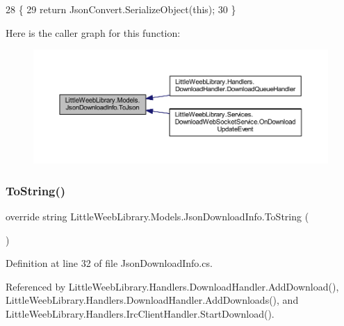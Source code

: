\begin{DoxyCode}
28         \{
29             \textcolor{keywordflow}{return} JsonConvert.SerializeObject(\textcolor{keyword}{this});
30         \}
\end{DoxyCode}
Here is the caller graph for this function\+:\nopagebreak
\begin{figure}[H]
\begin{center}
\leavevmode
\includegraphics[width=350pt]{class_little_weeb_library_1_1_models_1_1_json_download_info_a3fd450e7e2de8b9a936ba3b2cbeeaccb_icgraph}
\end{center}
\end{figure}
\mbox{\label{class_little_weeb_library_1_1_models_1_1_json_download_info_af36cbb3251b0efcd80a45f1fef89f5c9}} 
\subsubsection{\texorpdfstring{To\+String()}{ToString()}}
{\footnotesize\ttfamily override string Little\+Weeb\+Library.\+Models.\+Json\+Download\+Info.\+To\+String (\begin{DoxyParamCaption}{ }\end{DoxyParamCaption})}



Definition at line 32 of file Json\+Download\+Info.\+cs.



Referenced by Little\+Weeb\+Library.\+Handlers.\+Download\+Handler.\+Add\+Download(), Little\+Weeb\+Library.\+Handlers.\+Download\+Handler.\+Add\+Downloads(), and Little\+Weeb\+Library.\+Handlers.\+Irc\+Client\+Handler.\+Start\+Download().


